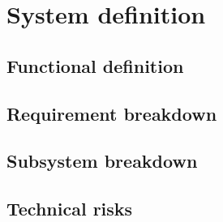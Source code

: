 \section{System definition}\label{cha:sysdef}

\subsection{Functional definition} \label{sec:funcdef}


\subsection{Requirement breakdown} \label{sec:reqbreak}


\subsection{Subsystem breakdown} \label{sec:subsysbreak}


\subsection{Technical risks} \label{sec:sysrisk}


